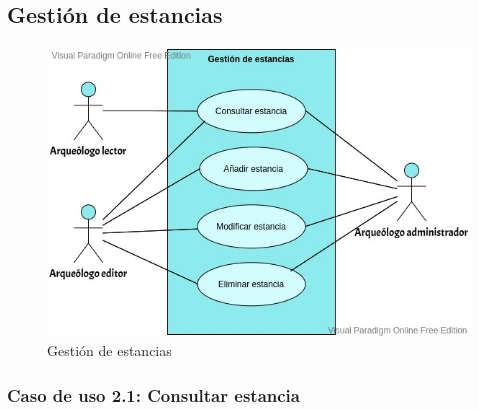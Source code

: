 \subsection{Gestión de estancias}
    \begin{figure}[H]
        \centering
        \includegraphics[scale=0.40]{imagenes/diagramas CU/room-UC.jpeg}
        \caption{Gestión de estancias}
        \label{fig:room-management}
    \end{figure}

\subsubsection{Caso de uso 2.1: Consultar estancia}

